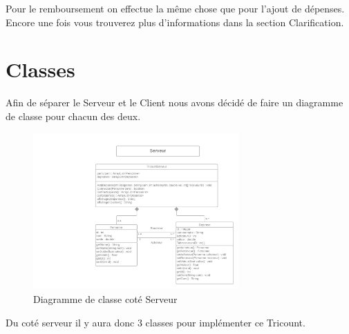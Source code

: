 \documentclass[12,french]{report}
\begin{document}
Pour le remboursement on effectue la même chose que pour l'ajout de dépenses. Encore une fois vous trouverez plus d'informations dans la section Clarification. 

\section{Classes}

Afin de séparer le Serveur et le Client nous avons décidé de faire un diagramme de classe pour chacun des deux.

\begin{figure}[H]
	\center
	\includegraphics[width=0.7\textwidth]{./Images_pooa/Diagramme_de_classe_Serveur}
	\caption{Diagramme de classe coté Serveur}
\end{figure}\vspace{0.2cm}

Du coté serveur il y aura donc 3 classes pour implémenter ce Tricount. \\
\end{document}
